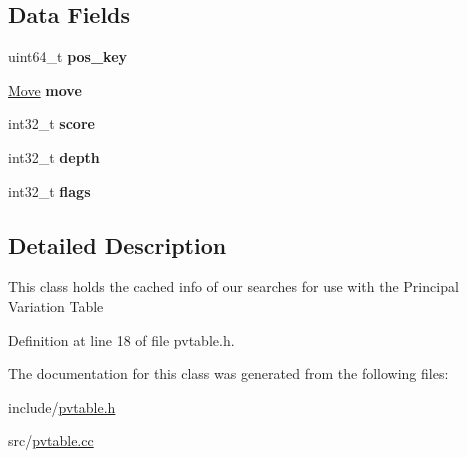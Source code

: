 \subsection*{Data Fields}
\begin{DoxyCompactItemize}
\item 
\mbox{\label{classPvEntry_ab1e717bdabc6da4bf546d0b1af252091}} 
uint64\+\_\+t {\bfseries pos\+\_\+key}
\item 
\mbox{\label{classPvEntry_a6e6ab2e38db069902f7aeb2dae727a1e}} 
\mbox{\hyperlink{classMove}{Move}} {\bfseries move}
\item 
\mbox{\label{classPvEntry_a00a4547715d4b994bf2e889e7a4b29a9}} 
int32\+\_\+t {\bfseries score}
\item 
\mbox{\label{classPvEntry_a75056e46bf9a3a8ed3955119fc83ace8}} 
int32\+\_\+t {\bfseries depth}
\item 
\mbox{\label{classPvEntry_a90d1ef7b561954f7265af72e3cdd94be}} 
int32\+\_\+t {\bfseries flags}
\end{DoxyCompactItemize}


\subsection{Detailed Description}
This class holds the cached info of our searches for use with the Principal Variation Table 

Definition at line 18 of file pvtable.\+h.



The documentation for this class was generated from the following files\+:\begin{DoxyCompactItemize}
\item 
include/\mbox{\hyperlink{pvtable_8h}{pvtable.\+h}}\item 
src/\mbox{\hyperlink{pvtable_8cc}{pvtable.\+cc}}\end{DoxyCompactItemize}
